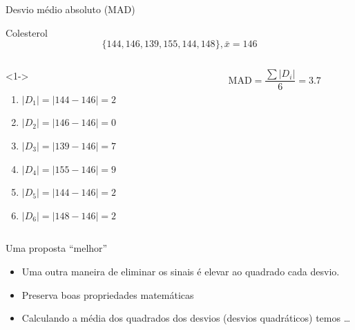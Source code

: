 \documentclass{beamer}
\begin{document}
\begin{frame}{\scriptsize Desvio médio absoluto (MAD)}
  \begin{exampleblock}{Colesterol}
    \footnotesize
  \begin{displaymath}
    \{144, 146, 139, 155, 144, 148\}, \bar{x} = 146
  \end{displaymath}
  \begin{columns}
    \begin{column}{5cm}<1->
      \begin{enumerate}
        \tiny
      \item $|D_1| = |144 - 146| = 2$
      \item $|D_2| = |146 - 146| = 0$
      \item $|D_3| = |139 - 146| = 7$
      \item $|D_4| = |155 - 146| = 9$
      \item $|D_5| = |144 - 146| = 2$
      \item $|D_6| = |148 - 146| = 2$
      \end{enumerate}
    \end{column}
    \begin{column}{5cm}
      \begin{displaymath}
        \mathrm{MAD} = \frac{\sum |D_i|}{6} = 3.7
      \end{displaymath}
    \end{column}
  \end{columns}
\end{exampleblock}
\end{frame}

\begin{frame}{\scriptsize Uma proposta ``melhor''}
  \begin{itemize}
    \footnotesize
  \item Uma outra maneira de eliminar os sinais é elevar ao quadrado
    cada desvio.
    \bigskip
  \item Preserva boas propriedades matemáticas
    \bigskip
  \item Calculando a média dos quadrados dos desvios (desvios
    quadráticos) temos \ldots
  \end{itemize}
\end{frame}
\end{document}
